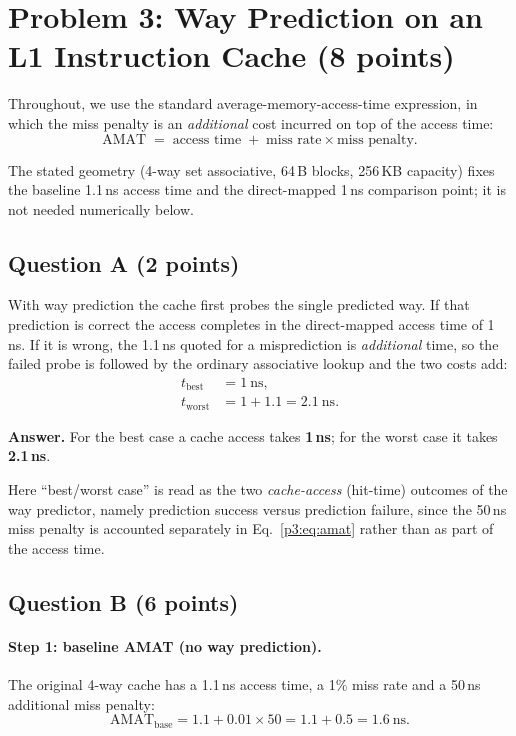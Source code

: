 \section*{Problem 3: Way Prediction on an L1 Instruction Cache (8 points)}

\noindent
Throughout, we use the standard average-memory-access-time expression, in which the miss
penalty is an \emph{additional} cost incurred on top of the access time:
\begin{equation}
  \label{p3:eq:amat}
  \mathrm{AMAT} \;=\; \text{access time} \;+\; \text{miss rate} \times \text{miss penalty}.
\end{equation}

\noindent
The stated geometry (4-way set associative, 64\,B blocks, 256\,KB capacity) fixes the
baseline 1.1\,ns access time and the direct-mapped 1\,ns comparison point; it is not
needed numerically below.

\subsection*{Question A (2 points)}

With way prediction the cache first probes the single predicted way. If that prediction
is correct the access completes in the direct-mapped access time of 1\,ns. If it is
wrong, the 1.1\,ns quoted for a misprediction is \emph{additional} time, so the failed
probe is followed by the ordinary associative lookup and the two costs add:
\begin{align}
  \label{p3:eq:cases}
  t_{\text{best}}  &= 1\ \mathrm{ns}, \\
  t_{\text{worst}} &= 1 + 1.1 = 2.1\ \mathrm{ns}.
\end{align}

\noindent
\textbf{Answer.} For the best case a cache access takes \textbf{1\,ns}; for the worst
case it takes \textbf{2.1\,ns}.

\medskip
\noindent
Here ``best/worst case'' is read as the two \emph{cache-access} (hit-time) outcomes of
the way predictor, namely prediction success versus prediction failure, since the 50\,ns
miss penalty is accounted separately in Eq.~\eqref{p3:eq:amat} rather than as part of
the access time.

\subsection*{Question B (6 points)}

\paragraph{Step 1: baseline AMAT (no way prediction).}
The original 4-way cache has a 1.1\,ns access time, a 1\% miss rate and a 50\,ns
additional miss penalty:
\begin{equation}
  \label{p3:eq:base}
  \mathrm{AMAT}_{\text{base}} = 1.1 + 0.01 \times 50 = 1.1 + 0.5 = 1.6\ \mathrm{ns}.
\end{equation}

